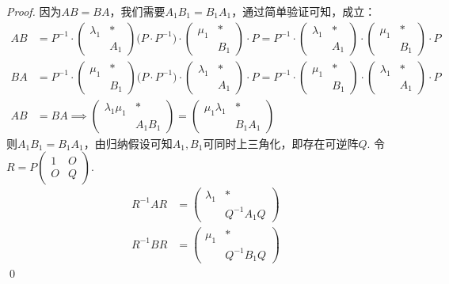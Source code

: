 \begin{proof}
	因为$AB=BA$，我们需要$A_1B_1 = B_1 A_1$，通过简单验证可知，成立：
	\begin{align*}
		AB &= P^{-1} \cdot \begin{pmatrix}
			\lambda_1 & \ast \\
			& A_1
		\end{pmatrix} \bigl( P \cdot P^{-1} \bigr) \cdot
		\begin{pmatrix}
			\mu_1 & \ast \\
			& B_1
		\end{pmatrix} \cdot P = P^{-1} \cdot \begin{pmatrix}
			\lambda_1 & \ast \\
			& A_1
		\end{pmatrix}
		\cdot 
		\begin{pmatrix}
			\mu_1 & \ast \\
			& B_1
		\end{pmatrix} \cdot P \\
		BA &= P^{-1} \cdot \begin{pmatrix}
			\mu_1 & \ast \\
			& B_1
		\end{pmatrix} \bigl( P \cdot P^{-1} \bigr) \cdot
		\begin{pmatrix}
			\lambda_1 & \ast \\
			& A_1
		\end{pmatrix} \cdot P = P^{-1} \cdot
		\begin{pmatrix}
			\mu_1 & \ast \\
			& B_1
		\end{pmatrix}
		\cdot 
		\begin{pmatrix}
			\lambda_1 & \ast \\
			& A_1
		\end{pmatrix}
		\cdot P
		\\
		AB &= BA \implies 
		\begin{pmatrix}
			\lambda_1 \mu_1 & \ast \\
			& A_1B_1
		\end{pmatrix}
		=
		\begin{pmatrix}
			 \mu_1 \lambda_1 & \ast \\
			& B_1A_1
		\end{pmatrix}  
	\end{align*}
	则$A_1 B_1=B_1 A_1$，由归纳假设可知$A_1, B_1$可同时上三角化，即存在可逆阵$Q$. 令$R=P \begin{pmatrix}
		1 & O \\
		O & Q
	\end{pmatrix}$.
	\begin{align*}
		R^{-1}AR &= \begin{pmatrix}
			\lambda_1 & \ast \\
			& Q^{-1}A_1Q
		\end{pmatrix} \\
		R^{-1}BR &= \begin{pmatrix}
			\mu_1 & \ast \\
			& Q^{-1}B_1Q
		\end{pmatrix}
	\end{align*}
	\qed{}
\end{proof}

